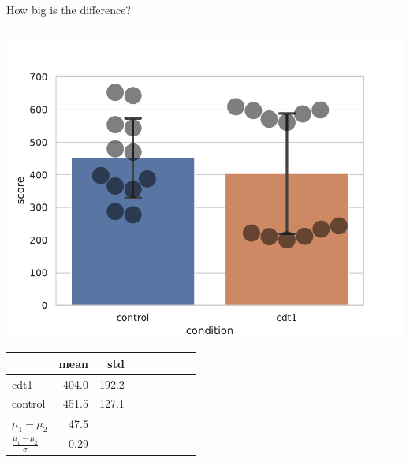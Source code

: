 \documentclass[compress]{beamer}
\begin{document}
\begin{frame}{How big is the difference?}
\begin{columns}
\begin{column}{0.33\linewidth}
{                \includegraphics[width=\columnwidth]{code/dataset1.pdf}

            \begin{center}
                \tiny
                \begin{tabular}{lrrrrrrrr}
                    \toprule
                    {} &  mean &         std\\ \midrule
                    cdt1      &   404.0 & 192.2 \\
                    control   &   451.5 & 127.1\\ \midrule
                    $\mu_1 - \mu_2$ & 47.5 & \only<5->{\\
                    $\frac{\mu_1 - \mu_2}{\sigma}$ & 0.29 &} \\
                    \bottomrule
                \end{tabular}
            \end{center}
        }

        \end{column}
    \end{columns}



\end{frame}
\end{document}
